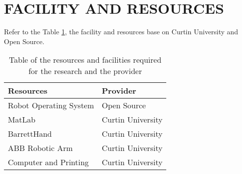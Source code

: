 

\section{FACILITY AND RESOURCES}
Refer to the Table \ref{table:table1}, the facility and resources base on Curtin University and Open Source. \\
\begin{table}[h]
	\centering
	\caption{Table of the resources and facilities required for the research and the provider} 
	\begin{tabular}{l l}
	\hline 	
	\bfseries{Resources} &\bfseries{Provider}\\ \hline
	Robot Operating System & Open Source\\
	MatLab                  & Curtin University\\
	BarrettHand             & Curtin University\\
	ABB Robotic Arm         & Curtin University\\
	Computer and Printing   & Curtin University\\
	\hline 
	\end{tabular}
	
	\label{table:table1}
\end{table}

